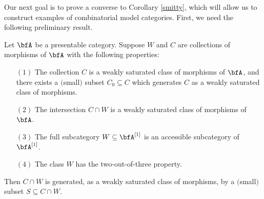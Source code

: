 Our next goal is to prove a converse to Corollary \ref{smitty}, which will allow us to construct examples of combinatorial model categories. First, we need the following preliminary result.

\begin{lemma}\label{seeva}
Let $\bfA$ be a presentable category. Suppose $W$ and $C$ are collections of morphisms
of $\bfA$ with the following properties:
\begin{itemize}
\item[$(1)$] The collection $C$ is a weakly saturated class of morphisms of $\bfA$, and there exists a $($small$)$ subset $C_0 \subseteq C$ which generates $C$ as a weakly saturated class of morphisms.
\item[$(2)$] The intersection $C \cap W$ is a weakly saturated class of morphisms of $\bfA$.
\item[$(3)$] The full subcategory $W \subseteq \bfA^{[1]}$ is an accessible subcategory
of $\bfA^{[1]}$.
\item[$(4)$] The class $W$ has the two-out-of-three property.
\end{itemize}
Then $C \cap W$ is generated, as a weakly saturated class of morphisms, by a $($small$)$ subset
$S \subseteq C \cap W$.
\end{lemma}

